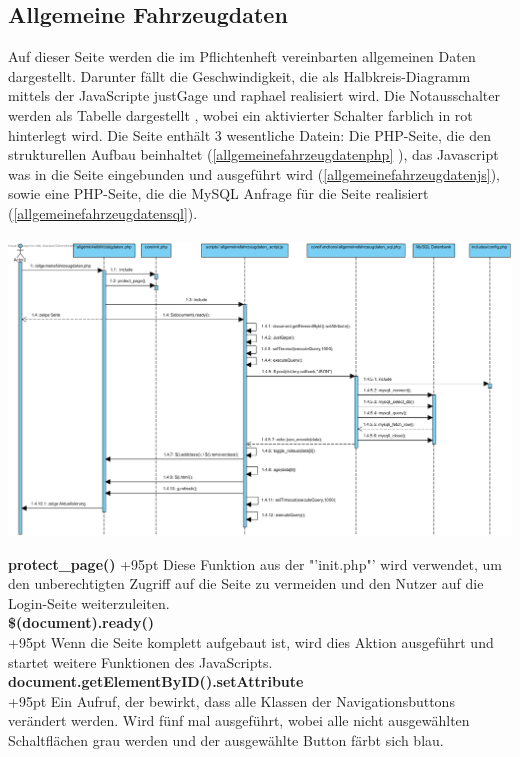 \documentclass[fontsize = 12pt, paper = a4]{scrreprt}
\begin{document}
\label{AllgemeineFahrzeugdatenpage}
\subsection{Allgemeine Fahrzeugdaten}

Auf dieser Seite werden die im Pflichtenheft vereinbarten allgemeinen Daten dargestellt. Darunter fällt die Geschwindigkeit, die als Halbkreis-Diagramm mittels der JavaScripte justGage und raphael realisiert wird. Die Notausschalter werden als Tabelle dargestellt , wobei ein aktivierter Schalter farblich in rot hinterlegt wird. Die Seite enthält 3 wesentliche Datein: Die PHP-Seite, die den strukturellen Aufbau beinhaltet (\ref{allgemeinefahrzeugdatenphp} ), das Javascript was in die Seite eingebunden und ausgeführt wird (\ref{allgemeinefahrzeugdatenjs}), sowie eine PHP-Seite, die die MySQL Anfrage für die Seite realisiert (\ref{allgemeinefahrzeugdatensql}). 
\\ \\


\includegraphics[scale=0.452]{allgemeinefahrzeugdaten.png}


\textbf{protect\_page()}
\hspace{0.5mm}
\hangindent+95pt  Diese Funktion aus der "'init.php"' wird verwendet, um den unberechtigten Zugriff auf die Seite zu vermeiden und den Nutzer auf die Login-Seite weiterzuleiten.\\


\textbf{\$(document).ready()}\\
\hangindent+95pt  
Wenn die Seite komplett aufgebaut ist, wird dies Aktion ausgeführt und startet weitere Funktionen des JavaScripts. \\


\textbf{document.getElementByID().setAttribute}\\
\hangindent+95pt   
Ein Aufruf, der bewirkt, dass alle Klassen der Navigationsbuttons verändert werden. Wird fünf mal ausgeführt, wobei alle nicht ausgewählten Schaltflächen grau werden und der ausgewählte Button färbt sich blau. \\
\end{document}
